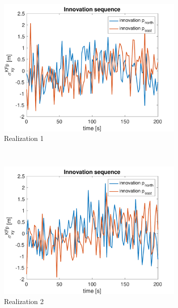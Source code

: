 \documentclass{article}
\begin{document}
\begin{figure}[H]
    \centering
    \begin{subfigure}[t]{0.49\textwidth}
        \centering
        \includegraphics[width=\textwidth]{1_innovation}
        \caption{Realization 1}
    \end{subfigure}
    ~
    \begin{subfigure}[t]{0.49\textwidth}
        \centering
        \includegraphics[width=\textwidth]{2_innovation}
        \caption{Realization 2}
    \end{subfigure}
    ~
    \begin{subfigure}[t]{0.49\textwidth}
        \centering

\end{subfigure}
\end{figure}
\end{document}
